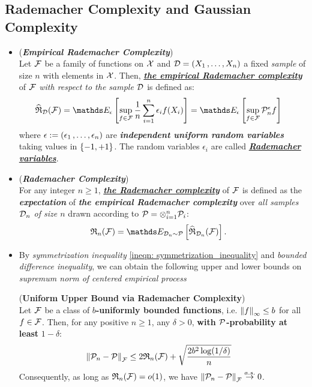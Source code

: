 \documentclass[11pt]{article}
\begin{document}
\subsection{Rademacher Complexity and Gaussian Complexity}
\begin{itemize}
\item \begin{definition} (\emph{\textbf{Empirical Rademacher Complexity}})\\
Let ${\mathcal F}$ be a family of functions on ${\mathcal X}$ and ${\mathcal D} = (X_1 \,{,}\ldots{,}\, X_n)$ a fixed \emph{sample} of size $n$ with elements in ${\mathcal X}$. Then, \underline{\emph{\textbf{the empirical Rademacher complexity}}} of ${\mathcal F}$ \emph{with respect to the sample ${\mathcal D}$} is defined as:
\begin{align}
\widehat{\mathfrak{R}}_{\cD}(\cF)&= \E{\epsilon}{\sup_{f \in \cF}\frac{1}{n}\sum_{i=1}^{n}\epsilon_{i}f(X_i)} = \E{\epsilon}{\sup_{f \in \cF} \cP_n^{\epsilon}f}  \label{eqn: rademacher_complexity}
\end{align}
where $\epsilon := (\epsilon_1 \,{,}\ldots{,}\, \epsilon_n)$ are  \textbf{\emph{independent uniform random variables}} taking values in $\left\{-1, +1\right\}$. The random variables $\epsilon_i$ are called \underline{\emph{\textbf{Rademacher variables}}}.
\end{definition}

\item \begin{definition} (\emph{\textbf{Rademacher Complexity}})\\
For any integer $n \ge 1$, \underline{\emph{\textbf{the Rademacher complexity}}} of ${\mathcal F}$ is defined as the \emph{\textbf{expectation}} of \emph{\textbf{the empirical Rademacher complexity}} over \emph{all samples ${\mathcal D}_n$ of size $n$} drawn according to ${\mathcal P} = \otimes_{i=1}^n{\mathcal P}_i$:
\begin{align*}
\frR_{n}(\cF) &= \E{\cD_n \sim \cP}{\widehat{\mathfrak{R}}_{\cD_n}(\cF)}.
\end{align*}
\end{definition}

\item By \emph{symmetrization inequality} \eqref{ineqn: symmetrization_inequality} and \emph{bounded difference inequality}, we can obtain the following upper and lower bounds on \emph{supremum norm of centered empirical process}
 \begin{proposition} \label{prop: radematcher_upper_bound} (\textbf{Uniform Upper Bound via Rademacher Complexity}) \citep{wainwright2019high}\\
Let ${\mathcal F}$ be a class of \textbf{$b$-uniformly bounded functions}, i.e. $\left\|f\right\|_{\infty} \le b$ for all $f \in {\mathcal F}$. Then, for any positive $n \ge 1$, any $\delta > 0$, \textbf{with ${\mathcal P}$-probability at least} $1 - \delta$:
\begin{align}
\left\|{\mathcal P}_n - {\mathcal P}\right\|_{{\mathcal F}} &\le  2 {\mathfrak R}_{n}({\mathcal F})  + \sqrt{\frac{2 b^2 \log(1 / \delta)}{n}} \label{eqn: Rademacher_upper_bound}
\end{align} Consequently, as long as ${\mathfrak R}_n({\mathcal F}) = o(1)$, we have $\left\|{\mathcal P}_n - {\mathcal P}\right\|_{{\mathcal F}} \stackrel{a.s.}{\to} 0$.
\end{proposition}


\end{itemize}
\end{document}
